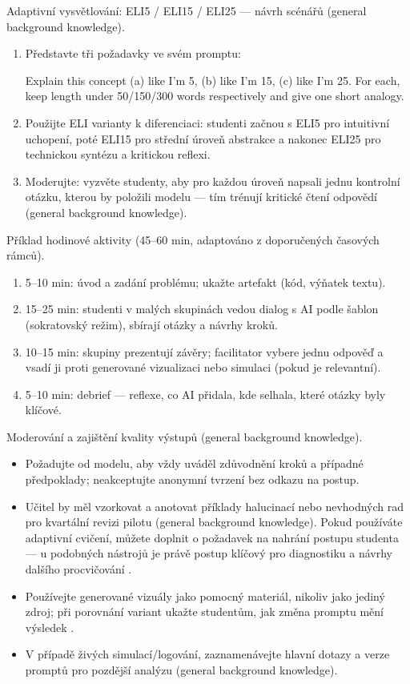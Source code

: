 \documentclass{report}%
\begin{document}
Adaptivní vysvětlování: ELI5 / ELI15 / ELI25 — návrh scénářů (general background knowledge).
\begin{enumerate}
  \item Představte tři požadavky ve svém promptu: 
\begin{PromptBlock}


Explain this concept (a) like I'm 5, (b) like I'm 15, (c) like I'm 25. For each, keep length under 50/150/300 words respectively and give one short analogy.
\end{PromptBlock}


  \item Použijte ELI varianty k diferenciaci: studenti začnou s ELI5 pro intuitivní uchopení, poté ELI15 pro střední úroveň abstrakce a nakonec ELI25 pro technickou syntézu a kritickou reflexi.
  \item Moderujte: vyzvěte studenty, aby pro každou úroveň napsali jednu kontrolní otázku, kterou by položili modelu — tím trénují kritické čtení odpovědí (general background knowledge).
\end{enumerate}

Příklad hodinové aktivity (45--60 min, adaptováno z doporučených časových rámců).
\begin{enumerate}
  \item 5--10 min: úvod a zadání problému; ukažte artefakt (kód, výňatek textu).
  \item 15--25 min: studenti v malých skupinách vedou dialog s AI podle šablon (sokratovský režim), sbírají otázky a návrhy kroků.
  \item 10--15 min: skupiny prezentují závěry; facilitator vybere jednu odpověď a vsadí ji proti generované vizualizaci nebo simulaci (pokud je relevantní).
  \item 5--10 min: debrief — reflexe, co AI přidala, kde selhala, které otázky byly klíčové.
\end{enumerate}

Moderování a zajištění kvality výstupů (general background knowledge).
\begin{itemize}
  \item Požadujte od modelu, aby vždy uváděl zdůvodnění kroků a případné předpoklady; neakceptujte anonymní tvrzení bez odkazu na postup.
  \item Učitel by měl vzorkovat a anotovat příklady halucinací nebo nevhodných rad pro kvartální revizi pilotu (general background knowledge). Pokud používáte adaptivní cvičení, můžete doplnit o požadavek na nahrání postupu studenta — u podobných nástrojů je právě postup klíčový pro diagnostiku a návrhy dalšího procvičování \cite{kb_ai_101_tipu_pdf_04e4a115_page_8_1}.
  \item Používejte generované vizuály jako pomocný materiál, nikoliv jako jediný zdroj; při porovnání variant ukažte studentům, jak změna promptu mění výsledek \cite{kb_ai_101_tipu_pdf_04e4a115_page_51_1}.
  \item V případě živých simulací/logování, zaznamenávejte hlavní dotazy a verze promptů pro pozdější analýzu (general background knowledge).
\end{itemize}
\end{document}
